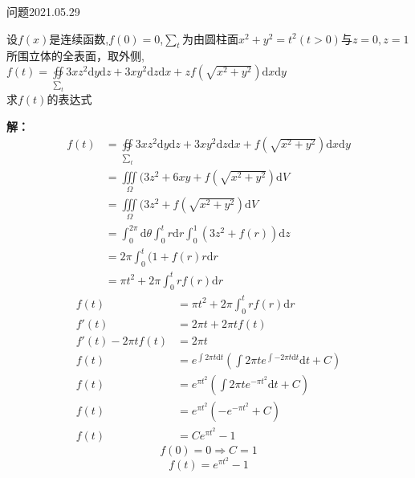 \begin{mybox}{问题2021.05.29}
	
	\qquad 设$f(x)$是连续函数,$f(0)=0$,$\sum_{t}$为由圆柱面$x^2+y^2=t^2(t>0)$与$z=0,z=1$所围立体的全表面，取外侧,$f(t)=\oiint\limits_{\sum_{t}} 3xz^2\mathrm{d}y\mathrm{d}z+3xy^2\mathrm{d}z\mathrm{d}x+zf(\sqrt{x^2+y^2})\mathrm{d}x\mathrm{d}y$\\
	求$f(t)$的表达式
\end{mybox}	
\noindent
\textbf{解：}
\begin{align*}
	f(t)&=\oiint\limits_{\sum_{t}} 3xz^2\mathrm{d}y\mathrm{d}z+3xy^2\mathrm{d}z\mathrm{d}x+f(\sqrt{x^2+y^2})\mathrm{d}x\mathrm{d}y\\
	&=\iiint\limits_{\Omega} (3z^2+6xy+f(\sqrt{x^2+y^2})\mathrm{d}V\\
	&=\iiint\limits_{\Omega} (3z^2+f(\sqrt{x^2+y^2}) \mathrm{d}V\\
	&=\int_{0}^{2\pi} \mathrm{d}\theta \int_{0}^{t} r\mathrm{d}r \int_{0}^{1} (3z^2+f(r))\mathrm{d}z\\
	&=2\pi \int_{0}^{t}(1+f(r)r\mathrm{d}r\\
	&=\pi t^2+2\pi\int_{0}^{t} rf(r)\mathrm{d}r
\end{align*}
\begin{align*}
	f(t)&=\pi t^2+2\pi\int_{0}^{t} rf(r)\mathrm{d}r\\
	f'(t)&=2\pi t+2\pi tf(t)\\
	f'(t)-2\pi tf(t)&=2\pi t\\
	f(t)&=e^{\int 2\pi t\mathrm{d} t} (\int 2\pi t e^{\int -2\pi t\mathrm{d} t} \mathrm{d}t+C)\\
	f(t)&=e^{\pi t^2} (\int 2\pi t e^{-\pi t^2} \mathrm{d}t+C)\\
	f(t)&=e^{\pi t^2} (-e^{-\pi t^2} +C)\\
	f(t)&=Ce^{\pi t^2}-1
\end{align*}
$$f(0)=0\Rightarrow C=1$$
$$f(t)=e^{\pi t^2}-1$$